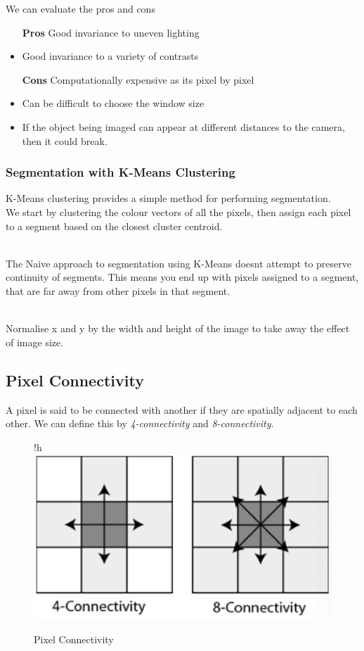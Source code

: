 \noindent We can evaluate the pros and cons

\begin{itemize}
    \itemsep0em
    \item [\textbf{Pros}] Good invariance to uneven lighting
    \item Good invariance to a variety of contrasts
    \item [\textbf{Cons}] Computationally expensive as its pixel by pixel
    \item Can be difficult to choose the window size
    \item If the object being imaged can appear at different distances to the camera, then it could break.
\end{itemize}

\subsubsection{Segmentation with K-Means Clustering}
K-Means clustering provides a simple method for performing segmentation.
\\
\noindent We start by clustering the colour vectors of all the pixels, then assign each pixel to a segment based on the closest cluster centroid.

\\

\noindent The Naive approach to segmentation using K-Means doesnt attempt to preserve continuity of segments. This means you end up with pixels assigned to a segment, that are far away from other pixels in that segment.

\\
\noindent Normalise x and y by the width and height of the image to take away the effect of image size.

\subsection{Pixel Connectivity}

A pixel is said to be connected with another if they are spatially adjacent to each other. We can define this by \textit{4-connectivity} and \textit{8-connectivity}.


\begin{figure}{!h}
    \centering
    \includegraphics[scale=0.4]{Images/pixcon.png}
    \caption{Pixel Connectivity}
    \label{fig:con}
\end{figure}

